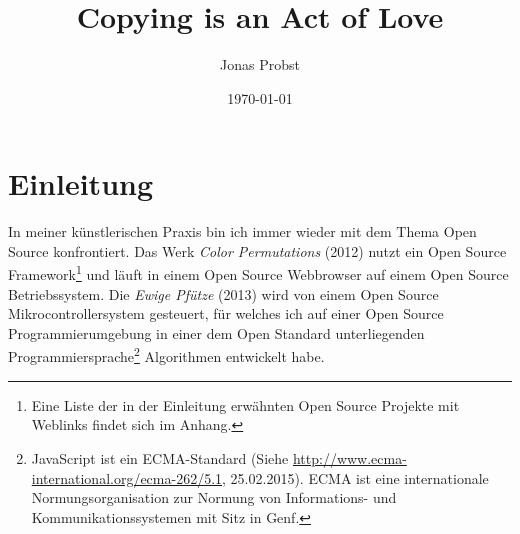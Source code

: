 \documentclass[
paper=164mm:234mm, %
pagesize, %
DIV=calc, %
10pt, %
parskip=half- %
]{scrbook}
\begin{document}
\extratitle{\null \vfill
\texttt{[image: cc\_by\_sa]} \\
\footnotesize{\emph{Copying is an Act of Love. Open Source in den Digitalen Künsten} von Jonas Probst steht unter der Creative Commons Attribution-ShareAlike 4.0 International Lizenz. Die Weiterverwendung ist nur unter gleichen Bedingungen und mit Namensnennung möglich. Eine Kopie der Lizenz befindet sich unter \url{http://creativecommons.org/licenses/by-sa/4.0/}.\\

Diese Arbeit wurde in LaTeX verfasst, einer auf dem Open Source Textsatzsystem TeX beruhenden Auszeichnungssprache. Der Quellcode befindet sich unter \\
\url{http://github.com/jonasprobst/copying-is-an-act-of-love}.}
}

\title{Copying is an Act of Love}

\author{Jonas Probst}

\date{\today}
\publishers{Hochschule der Künste Bern \\ MA Contemporary Arts Practice}
\lowertitleback{\normalsize{
Herzlichen Dank an\\
Andi Schoon, Rikka Feuz, Roger Villars, Micha Haarenberg und Hansjürg Wenger}}
\maketitle %


\newpage
\thispagestyle{empty}
\tableofcontents

{}
\chapter*{Einleitung}
In meiner künstlerischen Praxis bin ich immer wieder mit dem Thema Open Source konfrontiert. Das Werk \emph{Color Permutations} (2012) nutzt ein Open Source Framework\footnote{Eine Liste der in der Einleitung erwähnten Open Source Projekte mit Weblinks findet sich im Anhang.} und läuft in einem Open Source Webbrowser auf einem Open Source Betriebssystem. Die \emph{Ewige Pfütze} (2013) wird von einem Open Source Mikrocontrollersystem gesteuert, für welches ich auf einer Open Source Programmierumgebung in einer dem Open Standard unterliegenden Programmiersprache\footnote{JavaScript ist ein ECMA-Standard (Siehe \url{http://www.ecma-international.org/ecma-262/5.1}, 25.02.2015). ECMA ist eine internationale Normungsorganisation zur Normung von Informations- und Kommunikationssystemen mit Sitz in Genf.} Algorithmen entwickelt habe.
\end{document}
